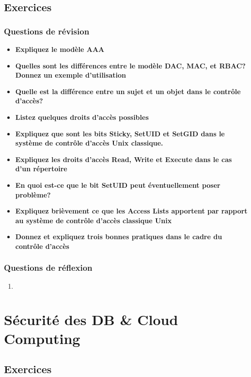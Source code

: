 \documentclass{report}
\begin{document}
	\section{Exercices}

		\subsection{Questions de révision}
			\begin{itemize}
				\item \textbf{Expliquez le modèle AAA}
				\item \textbf{Quelles sont les différences entre le modèle DAC, MAC, et RBAC? Donnez un exemple d'utilisation}
				\item \textbf{Quelle est la différence entre un sujet et un objet dans le contrôle d'accès?}
				\item \textbf{Listez quelques droits d'accès possibles}
				\item \textbf{Expliquez que sont les bits Sticky, SetUID et SetGID dans le système de contrôle d'accès Unix classique.}
				\item \textbf{Expliquez les droits d'accès Read, Write et Execute dans le cas d'un répertoire}
				\item \textbf{En quoi est-ce que le bit SetUID peut éventuellement poser problème?}
				\item \textbf{Expliquez brièvement ce que les Access Lists apportent par rapport au système de contrôle d'accès classique Unix}
				\item \textbf{Donnez et expliquez trois bonnes pratiques dans le cadre du contrôle d'accès}	
			\end{itemize}
				

		\subsection{Questions de réflexion}

			\begin{enumerate}
				\item 
			\end{enumerate}

\chapter{Sécurité des DB \& Cloud Computing}
	
	\section{Exercices}
\end{document}
